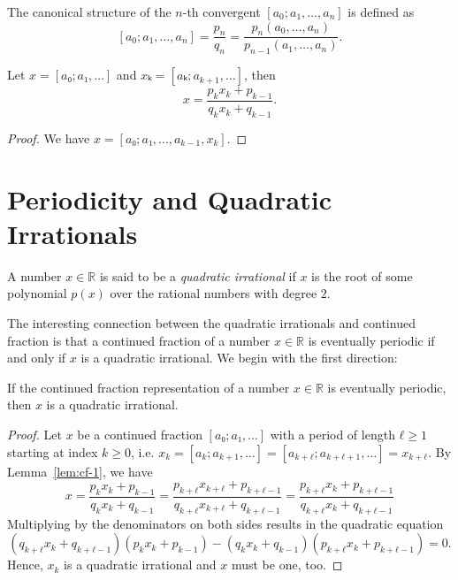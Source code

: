 \begin{definition}
  The canonical structure of the $n$-th convergent $[a_0; a_1, \dots, a_n]$ is defined as
  \[
    [a_0; a_1, \dots, a_n] = \frac{p_n}{q_n} = \frac{p_n(a_0, \dots, a_n)}{p_{n-1}(a_1, \dots, a_n)}.
  \]
\end{definition}

\begin{lemma}
  \label{lem:cf-1}
  Let $x = [a₀; a₁, …]$ and $xₖ = [aₖ; a_{k+1}, …]$, then
  \[
    x = \frac{p_k x_k + p_{k-1}}{q_k x_k + q_{k-1}}.
  \]
\end{lemma}

\begin{proof}
  We have $x = [a₀; a₁, …, a_{k-1}, x_k]$.
\end{proof}

\section{Periodicity and Quadratic Irrationals}

\begin{definition}
  A number $x ∈ ℝ$ is said to be a \emph{quadratic irrational} if $x$ is the root of some
  polynomial $p(x)$ over the rational numbers with degree $2$.
\end{definition}

The interesting connection between the quadratic irrationals and continued
fraction is that a continued fraction of a number $x ∈ ℝ$ is eventually
periodic if and only if $x$ is a quadratic irrational.
We begin with the first direction:

\begin{theorem}
  If the continued fraction representation of a number $x ∈ ℝ$ is eventually periodic,
  then $x$ is a quadratic irrational.
\end{theorem}

\begin{proof}
  Let $x$ be a continued fraction $[a₀; a₁, …]$ with a period of length $ℓ ≥ 1$ starting at index $k ≥ 0$,
  i.e. $x_k = [a_k; a_{k+1}, …] = [a_{k+ℓ}; a_{k+ℓ+1}, …] = x_{k+ℓ}$.
  By Lemma~\ref{lem:cf-1}, we have
  \[
    x
    = \frac{p_k x_k + p_{k-1}}{q_k x_k + q_{k-1}}
    = \frac{p_{k+ℓ} x_{k+ℓ} + p_{k+ℓ-1}}{q_{k+ℓ} x_{k+ℓ} + q_{k+ℓ-1}}
    = \frac{p_{k+ℓ} x_k + p_{k+ℓ-1}}{q_{k+ℓ} x_k + q_{k+ℓ-1}}
  \]
  Multiplying by the denominators on both sides results in the quadratic equation
  \[
    (q_{k+ℓ} x_k + q_{k+ℓ-1})(p_k x_k + p_{k-1}) - (q_k x_k + q_{k-1}) (p_{k+ℓ} x_k + p_{k+ℓ-1}) = 0.
  \]
  Hence, $x_k$ is a quadratic irrational and $x$ must be one, too.
\end{proof}

